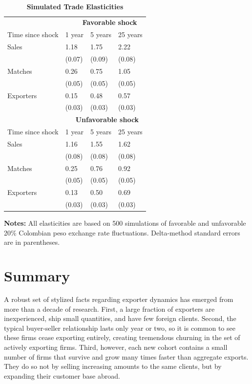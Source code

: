 \documentclass[12pt]{article}
\begin{document}
\begin{table}[tbp]
\caption{\textbf{Simulated Trade Elasticities}}\centering
{\small \ }
\par
{\small 
\begin{tabular}{llll}
\hline\hline
& \multicolumn{3}{l}{ \ \ \ \ \ \textbf{Favorable shock}} \\ \cline{2-4}
Time since shock & 1 year & 5 years & 25 years \\ \hline
Sales & 1.18 & 1.75 & 2.22 \\ 
& (0.07) & (0.09) & (0.08) \\ 
Matches & 0.26 & 0.75 & 1.05 \\ 
& (0.05) & (0.05) & (0.05) \\ 
Exporters & 0.15 & 0.48 & 0.57 \\ 
& (0.03) & (0.03) & (0.03) \\ 
& \multicolumn{3}{l}{ \ \ \ \textbf{Unfavorable shock}} \\ \cline{2-4}
Time since shock & 1 year & 5 years & 25 years \\ \hline
Sales & 1.16 & 1.55 & 1.62 \\ 
& (0.08) & (0.08) & (0.08) \\ 
Matches & 0.25 & 0.76 & 0.92 \\ 
& (0.05) & (0.05) & (0.05) \\ 
Exporters & 0.13 & 0.50 & 0.69 \\ 
& (0.03) & (0.03) & (0.03) \\ \hline
\end{tabular}
}
\par
{\endcenter
\begin{tablenotes}
\item \textbf{Notes:} All elasticities are based on 500 simulations of favorable and unfavorable 20\% Colombian peso exchange rate fluctuations.  Delta-method standard errors are in parentheses.
\end{tablenotes}
}
\label{tab:elasticities}
\end{table}

\pagebreak

\section{Summary}

A robust set of stylized facts regarding exporter dynamics has emerged from
more than a decade of research. First, a large fraction of exporters are
inexperienced, ship small quantities, and have few foreign clients. Second,
the typical buyer-seller relationship lasts only year or two, so it is
common to see these firms cease exporting entirely, creating tremendous
churning in the set of actively exporting firms. Third, however, each new
cohort contains a small number of firms that survive and grow many times
faster than aggregate exports. They do so not by selling increasing amounts
to the same clients, but by expanding their customer base abroad.
\end{document}

